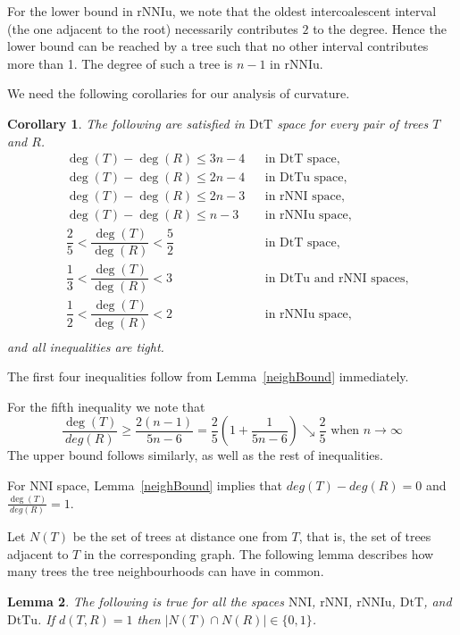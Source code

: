 \documentclass{amsart}
\newtheorem{lemma}{Lemma}
\newtheorem{corollary}[lemma]{Corollary}
\newcommand{\nni}{\mathrm{NNI}}
\newcommand{\rnni}{\mathrm{rNNI}}
\newcommand{\rnniu}{\mathrm{rNNIu}}
\newcommand{\mdts}{\mathrm{DtT}}
\newcommand{\mdtsu}{\mathrm{DtTu}}
\begin{document}
For the lower bound in $\rnniu$, we note that the oldest intercoalescent interval (the one adjacent to the root) necessarily contributes $2$ to the degree.
Hence the lower bound can be reached by a tree such that no other interval contributes more than 1.
The degree of such a tree is $n-1$ in $\rnniu$.
\endproof

We need the following corollaries for our analysis of curvature.

\begin{corollary}\label{degreeBounds}
The following are satisfied in $\mdts$ space for every pair of trees $T$ and $R$.
\begin{align*}
& \deg(T)-\deg(R) \leq 3n-4		&& \mbox{in $\mdts$ space,}\\
& \deg(T)-\deg(R) \leq 2n-4		&& \mbox{in $\mdtsu$ space,}\\
& \deg(T)-\deg(R) \leq 2n-3		&& \mbox{in $\rnni$ space,}\\
& \deg(T)-\deg(R) \leq n-3			&& \mbox{in $\rnniu$ space,}\\
& \dfrac25 < \dfrac{\deg(T)}{\deg(R)} < \dfrac52		&& \mbox{in $\mdts$ space,}\\
& \dfrac13 < \dfrac{\deg(T)}{\deg(R)} < 3			&& \mbox{in $\mdtsu$ and $\rnni$ spaces,}\\
& \dfrac12 < \dfrac{\deg(T)}{\deg(R)} < 2			&& \mbox{in $\rnniu$ space,}\\
\end{align*}
and all inequalities are tight.
\end{corollary}

\proof
The first four inequalities follow from Lemma~\ref{neighBound} immediately.

For the fifth inequality we note that
\[
\frac{\deg(T)}{deg(R)} \geq \frac{2(n-1)}{5n-6} = \frac25 \left(1 + \frac{1}{5n-6}\right) \searrow \frac 25 \mbox{ when } n\to\infty
\]
The upper bound follows similarly, as well as the rest of inequalities.
\endproof

For $\nni$ space, Lemma~\ref{neighBound} implies that $deg(T)-deg(R) = 0$ and $\frac{\deg(T)}{deg(R)} = 1$.

Let $N(T)$ be the set of trees at distance one from $T$, that is, the set of trees adjacent to $T$ in the corresponding graph.
The following lemma describes how many trees the tree neighbourhoods can have in common.

\begin{lemma}\label{intersecNeighb}
The following is true for all the spaces $\nni$, $\rnni$, $\rnniu$, $\mdts$, and $\mdtsu$.
If $d(T,R) = 1$ then $|N(T)\cap N(R)|\in\{0,1\}$.
\end{lemma}
\end{document}
